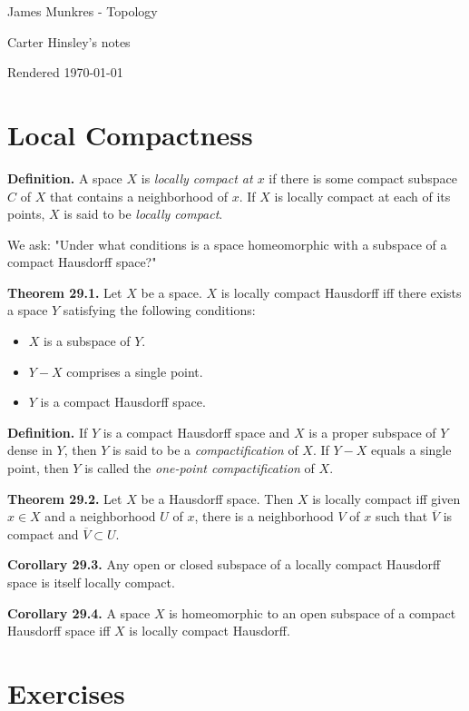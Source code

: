 \documentclass[a4paper]{article}
\begin{document}
\begin{center}
\LARGE{James Munkres - Topology}

\large{Carter Hinsley's notes}

Rendered \today
\end{center}

\setcounter{section}{28}
\section{Local Compactness}

\textbf{Definition.} A space $X$ is \emph{locally compact at $x$} if there is some compact subspace $C$ of $X$ that contains a neighborhood of $x$. If $X$ is locally compact at each of its points, $X$ is said to be \emph{locally compact}.

We ask: "Under what conditions is a space homeomorphic with a subspace of a compact Hausdorff space?"

\textbf{Theorem 29.1.} Let $X$ be a space. $X$ is locally compact Hausdorff iff there exists a space $Y$ satisfying the following conditions:
\begin{itemize}
    \item $X$ is a subspace of $Y$.
    \item $Y - X$ comprises a single point.
    \item $Y$ is a compact Hausdorff space.
\end{itemize}

\textbf{Definition.} If $Y$ is a compact Hausdorff space and $X$ is a proper subspace of $Y$ dense in $Y$, then $Y$ is said to be a \emph{compactification} of $X$. If $Y - X$ equals a single point, then $Y$ is called the \emph{one-point compactification} of $X$.

\textbf{Theorem 29.2.} Let $X$ be a Hausdorff space. Then $X$ is locally compact iff given $x \in X$ and a neighborhood $U$ of $x$, there is a neighborhood $V$ of $x$ such that $\overline{V}$ is compact and $\overline{V} \subset U$.

\textbf{Corollary 29.3.} Any open or closed subspace of a locally compact Hausdorff space is itself locally compact.

\textbf{Corollary 29.4.} A space $X$ is homeomorphic to an open subspace of a compact Hausdorff space iff $X$ is locally compact Hausdorff.

\section*{Exercises}
\end{document}
